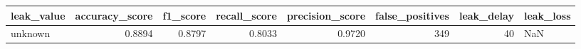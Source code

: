 \begin{tabular}{lrrrrrrl}
\toprule
leak\_value & accuracy\_score & f1\_score & recall\_score & precision\_score & false\_positives & leak\_delay & leak\_loss \\
\midrule
unknown & 0.8894 & 0.8797 & 0.8033 & 0.9720 & 349 & 40 & NaN \\
\bottomrule
\end{tabular}

